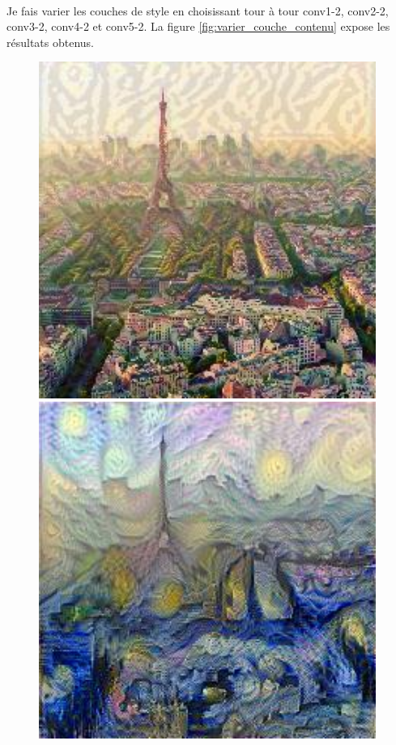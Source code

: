 \documentclass{article}
\begin{document}
\paragraph*{}
Je fais varier les couches de style en choisissant tour à tour conv1-2, conv2-2, conv3-2, conv4-2 et conv5-2. La figure \ref{fig:varier_couche_contenu} expose les résultats obtenus.
\begin{figure}[!htb]
\centering
\begin{minipage}{0.2\textwidth}
\centering
\includegraphics[width=0.98\textwidth]{../Images/transfer/paris_starrynight_c_conv_1_2.jpg}
\end{minipage}%
\begin{minipage}{0.2\textwidth}
\centering
\includegraphics[width=0.98\textwidth]{../Images/transfer/paris_starrynight_c_conv_2_2.jpg}

\end{minipage}
\end{figure}
\end{document}
